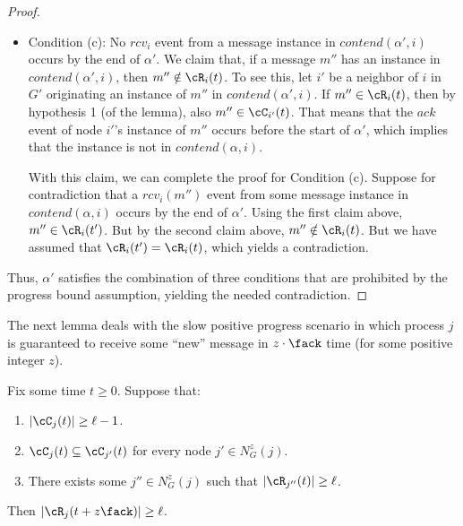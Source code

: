 \begin{proof}
\begin{itemize}
\item
Condition (c):  No $rcv_i$ event from a message instance in
$contend(\alpha',i)$ occurs by the end of $\alpha'$.
We claim that, if a message $m''$ has an instance in
$contend(\alpha',i)$, then $m'' \notin \cR_i(t)$.
To see this, let $i'$ be a neighbor of $i$ in $G'$ originating an instance of
$m''$ in $contend(\alpha',i)$.
If $m'' \in \cR_i(t)$, then by hypothesis 1 (of the lemma), also $m'' \in \cC_{i'}(t)$.
That means that the $ack$ event of node $i'$'s instance of $m''$
occurs before the start of $\alpha'$, which implies that the instance
is not in $contend(\alpha,i)$.



With this claim, we can complete the proof for Condition (c).
Suppose for contradiction that a $rcv_i(m'')$ event from some message
instance in $contend(\alpha,i)$ occurs by the end of $\alpha'$.
Using the first claim above, $m'' \in \cR_i(t')$.
But by the second claim above, $m'' \notin \cR_i(t)$.
But we have assumed that $\cR_i(t') = \cR_i(t)$, which yields a
contradiction.
\end{itemize}

Thus, $\alpha'$ satisfies the combination of three conditions that
are prohibited by the progress bound assumption, yielding the needed
contradiction.
\end{proof}





The next lemma deals with the slow positive progress scenario in which  process $j$ is guaranteed to receive some ``new'' message in $z \cdot \fack$ time (for some positive integer $z$).


\begin{lemma}
Fix some time $t\geq 0$. Suppose that:
\begin{enumerate}

\item
$|\cC_{j}(t)|\geq \ell-1$.

\item
$\cC_{j}(t) \subseteq \cC_{j'}(t)$ for every node $j' \in N_G^z(j)$.

\item
There exists some $j'' \in N_G^z(j)$ such that $|\cR_{j''}(t) |\geq \ell$.
\label{item: condition: there exists some j'' s t Rj''(t) geq ell}

\end{enumerate}
Then $|\cR_j(t + z \fack)| \geq \ell$.
\label{lemma: progress in z cdot Fack}
\end{lemma}

